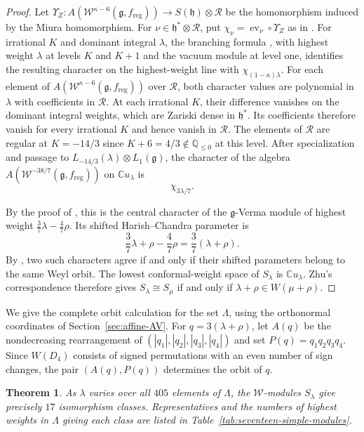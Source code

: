 \documentclass[11pt]{amsart}
\numberwithin{equation}{section}
\newtheorem{theorem}{Theorem}[section]
\theoremstyle{definition}
\theoremstyle{remark}
\newcommand{\CC}{\mathbb C}
\newcommand{\QQ}{\mathbb Q}
\newcommand{\g}{\mathfrak g}
\newcommand{\h}{\mathfrak h}
\newcommand{\W}{\mathcal W}
\newcommand{\reg}{\mathrm{reg}}
\begin{document}
\begin{proof}
Let $\Upsilon_Z:A(\W^{\kappa-6}(\g,f_{\reg}))\to S(\h)\otimes\mathscr R$
be the homomorphism induced by the Miura homomorphism. For
$\nu\in\h^*\otimes\mathscr R$, put $\chi_\nu=\operatorname{ev}_\nu\circ\Upsilon_Z$
as in \cite[(27)]{ACL}. For irrational $K$ and dominant integral
$\lambda$, the branching formula \cite[Theorem~11.1]{ACL}, with highest
weight $\lambda$ at levels $K$ and $K+1$ and the vacuum module at level
one, identifies the resulting character on the highest-weight line with
$\chi_{(1-\kappa)\lambda}$.
For each element of $A(\W^{\kappa-6}(\g,f_{\reg}))$ over $\mathscr R$,
both character values are polynomial in $\lambda$ with coefficients
in $\mathscr R$. At each irrational $K$, their difference vanishes
on the dominant integral weights, which are Zariski dense in $\h^*$.
Its coefficients therefore vanish for every irrational $K$ and hence
vanish in $\mathscr R$. The elements of $\mathscr R$ are regular
at $K=-14/3$ since $K+6=4/3\notin\QQ_{\leq0}$ at this level.
After specialization and passage to
$L_{-14/3}(\lambda)\otimes L_1(\g)$, the character of the
algebra $A(\W^{-38/7}(\g,f_{\reg}))$ on $\CC u_\lambda$ is
\begin{equation}\label{eq:A-coset-character}
 \chi_{3\lambda/7}.
\end{equation}

By the proof of \cite[Proposition~6.2]{ACL}, this is the central
character of the $\g$-Verma module of highest weight
$\frac37\lambda-\frac47\rho$. Its shifted Harish--Chandra parameter is
\[
 \frac37\lambda+\rho-\frac47\rho=\frac37(\lambda+\rho).
\]
By \cite[(29)]{ACL}, two such characters agree if and only if their
shifted parameters belong to the same Weyl orbit.
The lowest conformal-weight space of $S_\lambda$ is $\CC u_\lambda$.
Zhu's correspondence therefore gives
$S_\lambda\cong S_\mu$ if and only if
$\lambda+\rho\in W(\mu+\rho)$.
\end{proof}


We give the complete orbit calculation for the set $\Lambda$,
using the orthonormal coordinates of Section~\ref{sec:affine-AV}.
For $q=3(\lambda+\rho)$, let $A(q)$ be the nondecreasing
rearrangement of $(|q_1|,|q_2|,|q_3|,|q_4|)$ and set
$P(q)=q_1q_2q_3q_4$.
Since $W(D_4)$ consists of signed permutations with an even
number of sign changes, the pair $(A(q),P(q))$ determines the
orbit of $q$.

\begin{theorem}\label{thm:seventeen-simple-quotients}
As $\lambda$ varies over all $405$ elements of $\Lambda$, the
$\mathcal W$-modules $S_\lambda$ give precisely $17$ isomorphism classes.
Representatives and the numbers of highest weights in $\Lambda$ giving
each class are listed in Table~\ref{tab:seventeen-simple-modules}.
\end{theorem}
\end{document}
